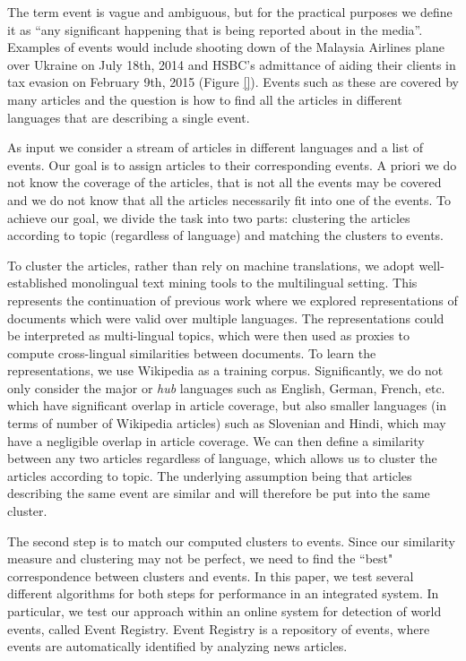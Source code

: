 \documentclass[twoside,11pt]{article}
\begin{document}
The term event is vague and ambiguous, but for the practical purposes we define it as ``any significant happening that is being reported about in the media''. Examples of events would include shooting down of the Malaysia Airlines plane over Ukraine on July 18th, 2014 and HSBC's admittance of aiding their clients in tax evasion on February 9th, 2015 (Figure \ref{}). Events such as these are covered by many articles and the question is how to find all the articles in different languages that are describing a single event.

As input we consider a stream of articles in different languages and a list of events. Our goal is to assign articles to their corresponding events. A priori we do not know the coverage of the articles, that is not all the events may be covered and we do not know that all the articles necessarily fit into one of the events.  To achieve our goal, we divide the task into two parts: clustering the articles according to topic (regardless of language) and matching the clusters to events.

To cluster the articles, rather than rely on machine translations, we adopt well-established monolingual text mining tools to the multilingual setting. This represents the continuation of previous work \cite{nips, iti, nips2, sikdd} where we explored representations of documents which were valid over multiple languages.  The representations could be interpreted as multi-lingual topics, which were then used as proxies to compute cross-lingual similarities between documents. To learn the representations, we use Wikipedia as a training corpus. Significantly, we do not only consider the major or \emph{hub} languages such as English, German, French, etc. which have significant overlap in article coverage, but also smaller languages (in terms of number of Wikipedia articles) such as Slovenian and Hindi, which may have a negligible overlap in article coverage. We can then define a similarity between any two articles regardless of language,  which allows us to cluster the articles according to topic. The underlying assumption being that articles describing the same event are similar  and will therefore be put into the same cluster.

The second step is to match our computed clusters to events. Since our similarity measure and clustering
may not be perfect, we need to find the ``best" correspondence between clusters and events. In this paper, we test several different algorithms for both steps for performance in an integrated system. In particular, we test our approach within an online system for detection of world events, called Event Registry\cite{Leban2014W, Leban2014I}. Event Registry is a repository of events, where events are automatically identified by analyzing news articles.
\end{document}
